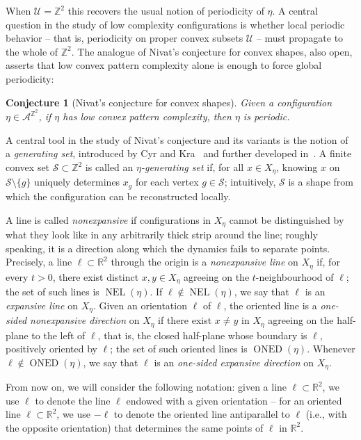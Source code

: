 \documentclass[12pt]{amsart}
\numberwithin{equation}{section}
\newtheorem{conjecture}[theorem]{Conjecture}
\DeclareMathOperator{\nexpl}{NEL}
\DeclareMathOperator{\nexpd}{ONED}
\newcommand{\bb}[1]{\mathbb{#1}}
\begin{document}
When $ \mathcal U = \mathbb Z^2 $ this recovers the usual notion of periodicity of $ \eta $. A central question in the study of low complexity configurations is whether local periodic behavior -- that is, periodicity on proper convex subsets $ \mathcal U $ -- must propagate to the whole of $\mathbb Z^2$. The analogue of Nivat's conjecture for convex shapes, also open, asserts that low convex pattern complexity alone is enough to force global periodicity:

\begin{conjecture}[Nivat's conjecture for convex shapes]
Given a configuration $\eta \in \mathcal{A}^{\mathbb{Z}^2}$, if $ \eta $ has low convex 
pattern complexity, then $\eta$ is periodic.
\end{conjecture}

A central tool in the study of Nivat's conjecture and its variants is the notion of a \emph{generating set}, introduced by Cyr and Kra~\cite{CyrKra15} and further developed in~\cite{FranksKra20}.
A finite convex set $\mathcal S \subset \mathbb Z^2$ is called an \emph{$\eta$-generating
set} if, for all $x \in X_{\eta}$, knowing $x$ on $\mathcal S \setminus \{g\}$ uniquely determines $x_g$
for each vertex $g \in \mathcal S$; intuitively, $ \mathcal S $ is a shape from which the configuration can be reconstructed locally. 

A line is called \emph{nonexpansive} if configurations in $ X_\eta $ cannot be distinguished by what they look like in any arbitrarily thick strip around the line; roughly speaking, it is a direction along which the dynamics fails to separate points. Precisely, a line $\ell\subset\mathbb R^2$ through the origin is a \emph{nonexpansive
line} on $X_\eta$ if, for every $t>0$, there exist distinct
$x,y\in X_\eta$ agreeing on the $t$-neighbourhood of $\ell$; the set
of such lines is $\nexpl(\eta)$. 
If $ \ell \notin \nexpl(\eta) $, we say that $ \ell $ is an \emph{expansive line} on $ X_\eta $.
Given an orientation $\pmb{\ell}$ of $\ell$, the
oriented line is a \emph{one-sided nonexpansive direction} on $X_{\eta}$ if there
exist $x\ne y$ in $X_\eta$ agreeing on the half-plane to the left of
$\pmb{\ell}$, that is, the closed half-plane whose boundary is
$\ell$, positively oriented by $\pmb{\ell}$; the set of such oriented
lines is $\nexpd(\eta)$. 
Whenever $ \pmb{\ell} \notin \nexpd(\eta) $, we say that $ \pmb{\ell} $ is an \emph{one-sided expansive direction} on $ X_\eta $.

From now on, we will consider the following notation: given a line $\ell \subset \bb{R}^2$, we use $\pmb{\ell}$ to denote the line $\ell$ endowed with a given orientation -- for an oriented line $\pmb{\ell} \subset \bb{R}^2$, we use $-\pmb{\ell}$ to denote the oriented line antiparallel to $\pmb{\ell}$ (i.e., with the opposite orientation) that determines the same points of $\pmb{\ell}$ in $\bb{R}^2$.
\end{document}
